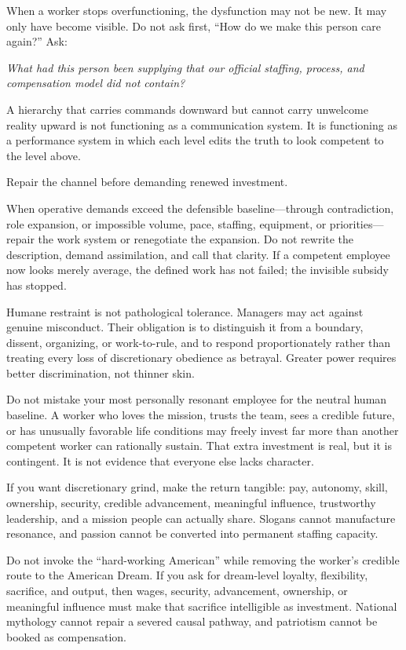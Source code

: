 \documentclass[11pt,oneside]{article}
\renewenvironment{quote}
  {\begin{tcolorbox}[
      enhanced,
      breakable,
      colback=ManifestLight,
      colframe=ManifestRule,
      boxrule=0pt,
      leftrule=3pt,
      arc=0pt,
      outer arc=0pt,
      left=10pt,right=10pt,top=8pt,bottom=8pt,
      before skip=0.8em,after skip=0.8em
    ]\itshape}
  {\end{tcolorbox}}
\begin{document}
When a worker stops overfunctioning, the dysfunction may not be new. It
may only have become visible. Do not ask first, ``How do we make this
person care again?'' Ask:

\begin{quote}
What had this person been supplying that our official staffing, process,
and compensation model did not contain?
\end{quote}

A hierarchy that carries commands downward but cannot carry unwelcome
reality upward is not functioning as a communication system. It is
functioning as a performance system in which each level edits the truth
to look competent to the level above.

Repair the channel before demanding renewed investment.

When operative demands exceed the defensible baseline---through
contradiction, role expansion, or impossible volume, pace, staffing,
equipment, or priorities---repair the work system or renegotiate the
expansion. Do not rewrite the description, demand assimilation, and call
that clarity. If a competent employee now looks merely average, the
defined work has not failed; the invisible subsidy has stopped.

Humane restraint is not pathological tolerance. Managers may act against
genuine misconduct. Their obligation is to distinguish it from a
boundary, dissent, organizing, or work-to-rule, and to respond
proportionately rather than treating every loss of discretionary
obedience as betrayal. Greater power requires better discrimination, not
thinner skin.

Do not mistake your most personally resonant employee for the neutral
human baseline. A worker who loves the mission, trusts the team, sees a
credible future, or has unusually favorable life conditions may freely
invest far more than another competent worker can rationally sustain.
That extra investment is real, but it is contingent. It is not evidence
that everyone else lacks character.

If you want discretionary grind, make the return tangible: pay,
autonomy, skill, ownership, security, credible advancement, meaningful
influence, trustworthy leadership, and a mission people can actually
share. Slogans cannot manufacture resonance, and passion cannot be
converted into permanent staffing capacity.

Do not invoke the ``hard-working American'' while removing the worker's
credible route to the American Dream. If you ask for dream-level
loyalty, flexibility, sacrifice, and output, then wages, security,
advancement, ownership, or meaningful influence must make that sacrifice
intelligible as investment. National mythology cannot repair a severed
causal pathway, and patriotism cannot be booked as compensation.
\end{document}
